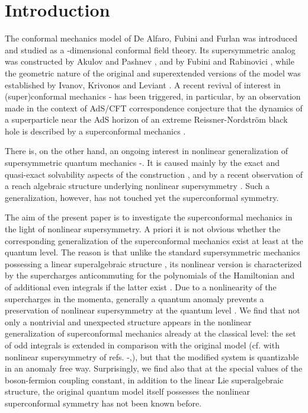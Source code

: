 \documentclass[a4paper,12pt]{article}
\begin{document}
\newpage
\section{\protect\bigskip Introduction}

The conformal mechanics model of De Alfaro, Fubini and
Furlan
\cite{AFF} was introduced and studied as a \coordHE{}-dimensional
conformal
field theory. Its
supersymmetric analog was constructed
by Akulov and Pashnev \cite{AP}, and by Fubini and
Rabinovici
\cite{FR},  while the geometric nature of the original
and superextended versions of the model was established by
Ivanov, Krivonos and Leviant \cite{IKL}.
A recent revival of interest
in (super)conformal mechanics \cite{BH}-\cite{LP}
has been  triggered, in particular, by an
observation made in the
context of AdS/CFT correspondence conjecture \cite{AdS}
that the dynamics of a superparticle near the AdS
horizon of an extreme Reissner-Nordstr\"om black hole
is described by a superconformal mechanics
\cite{BH}.

There is, on the other hand,  an ongoing interest in
nonlinear generalization
of supersymmetric
quantum mechanics \cite{AIS}-\cite{AS}.
It is
caused mainly by the  exact
and quasi-exact solvability aspects of
the construction \cite{KP1,A1,KP2},
and by a recent observation of a reach algebraic structure
underlying nonlinear supersymmetry \cite{KP3}.
Such a generalization, however, has not touched yet
the superconformal symmetry.

The aim of the present paper is to
investigate the superconformal mechanics
in the light of nonlinear supersymmetry.
A priori it is not obvious whether
the corresponding generalization
of the superconformal mechanics exist
at least at the quantum level.
The reason is that unlike the standard
supersymmetric mechanics
possessing a linear superalgebraic structure \cite{Wit},
its nonlinear version is characterized by
the supercharges anticommuting for the
polynomials of the Hamiltonian
and of additional  even integrals if the
latter exist \cite{KP3}.
Due to a nonlinearity of the supercharges in the momenta,
generally a quantum anomaly prevents
a preservation of nonlinear supersymmetry
at the quantum level \cite{P1,KP1}.
We find that not only a nontrivial and unexpected
structure appears in the nonlinear generalization of
superconformal mechanics
already at the classical level:
the set of odd integrals is extended in
comparison with the original model \cite{AP,FR}
(cf. with nonlinear supersymmetry
of refs. \cite{KP1}-\cite{KP4},\cite{AS}),
but that the modified system is quantizable
in an anomaly free way.
Surprisingly, we find also that
at the special values
of the boson-fermion coupling constant,
in addition to the linear  \coordHE{}
Lie superalgebraic structure,
the original quantum
model \cite{AP,FR} itself
possesses the nonlinear superconformal symmetry
has not been known before.
\end{document}
